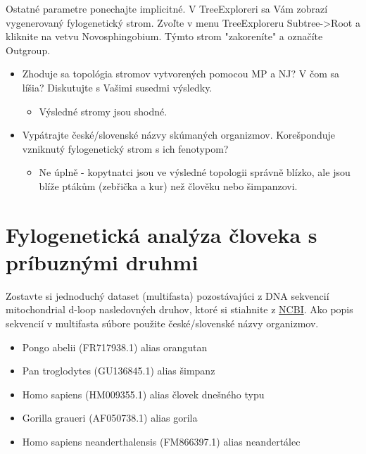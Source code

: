 \documentclass[11pt]{article}
\begin{document}
Ostatné parametre ponechajte implicitné. V TreeExploreri sa Vám zobrazí
vygenerovaný fylogenetický strom. Zvoľte v menu TreeExploreru Subtree->Root a
kliknite na vetvu Novosphingobium.  Týmto strom "zakoreníte" a označíte
Outgroup.

\begin{itemize}
\item Zhoduje sa topológia stromov vytvorených pomocou MP a NJ? V čom sa líšia?
Diskutujte s Vašimi susedmi výsledky.
\begin{itemize}
\item Výsledné stromy jsou shodné.
\end{itemize}
\item Vypátrajte české/slovenské názvy skúmaných organizmov. Korešponduje vzniknutý
fylogenetický strom s ich fenotypom?
\begin{itemize}
\item Ne úplně - kopytnatci jsou ve výsledné topologii správně blízko, ale jsou blíže
ptákům (zebřička a kur) než člověku nebo šimpanzovi.
\end{itemize}
\end{itemize}

\section{Fylogenetická analýza človeka s príbuznými druhmi}
\label{sec:orgd3e96b3}
Zostavte si jednoduchý dataset (multifasta) pozostávajúci z DNA sekvencií
mitochondrial d-loop nasledovných druhov, ktoré si stiahnite z \href{http://www.ncbi.nlm.nih.gov/nuccore/}{NCBI}. Ako popis
sekvencií v multifasta súbore použite české/slovenské názvy organizmov.
\begin{itemize}
\item Pongo abelii (FR717938.1) alias orangutan
\item Pan troglodytes (GU136845.1) alias šimpanz
\item Homo sapiens (HM009355.1) alias človek dnešného typu
\item Gorilla graueri (AF050738.1) alias gorila
\item Homo sapiens neanderthalensis (FM866397.1) alias neandertálec
\end{itemize}
\end{document}
